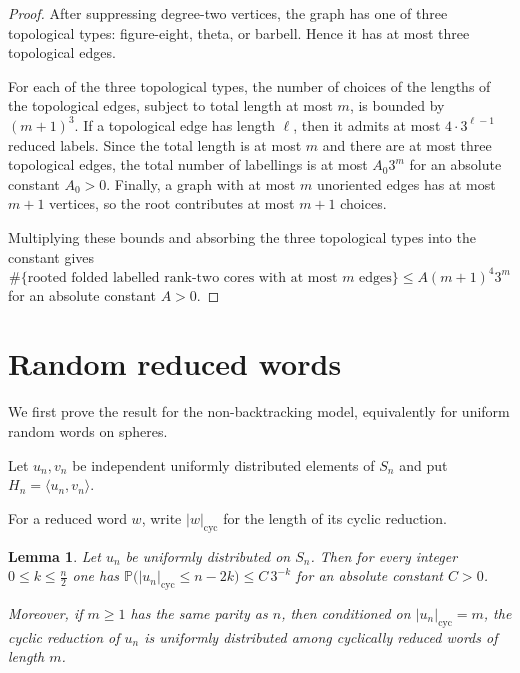 \documentclass{amsproc}
\newtheorem{lemma}[theorem]{Lemma}
\newcommand{\Prob}{\mathbb P}
\begin{document}
\begin{proof}
After suppressing degree-two vertices, the graph has one of three topological
types: figure-eight, theta, or barbell.  Hence it has at most three
topological edges.

For each of the three topological types, the number of choices of the lengths
of the topological edges, subject to total length at most $m$, is bounded by
$(m+1)^3$.  If a topological edge has length $\ell$, then it admits at most
$4\cdot 3^{\ell-1}$ reduced labels.  Since the total length is at most $m$ and
there are at most three topological edges, the total number of labellings is at
most $A_0 3^m$ for an absolute constant $A_0>0$.  Finally, a graph with at most
$m$ unoriented edges has at most $m+1$ vertices, so the root contributes at
most $m+1$ choices.

Multiplying these bounds and absorbing the three topological types into the
constant gives
\[
        \#\{\text{rooted folded labelled rank-two cores with at most }m
        \text{ edges}\}
        \leq A(m+1)^4 3^m
\]
for an absolute constant $A>0$.
\end{proof}

\section{Random reduced words}\label{S.random-words}

We first prove the result for the non-backtracking model, equivalently for
uniform random words on spheres.

Let $u_n,v_n$ be independent uniformly distributed elements of $S_n$ and put
$H_n=\langle u_n,v_n\rangle$.

For a reduced word $w$, write $|w|_{\mathrm{cyc}}$ for the length of its cyclic
reduction.

\begin{lemma}
Let $u_n$ be uniformly distributed on $S_n$.  Then for every integer
$0\leq k\leq \frac{n}{2}$ one has
$\Prob\bigl(|u_n|_{\mathrm{cyc}}\leq n-2k\bigr)\leq C\,3^{-k}$
for an absolute constant $C>0$.

Moreover, if $m\geq 1$ has the same parity as $n$, then conditioned on
$|u_n|_{\mathrm{cyc}}=m$, 
the cyclic reduction of $u_n$ is uniformly distributed among cyclically
reduced words of length $m$.
\end{lemma}
\end{document}
